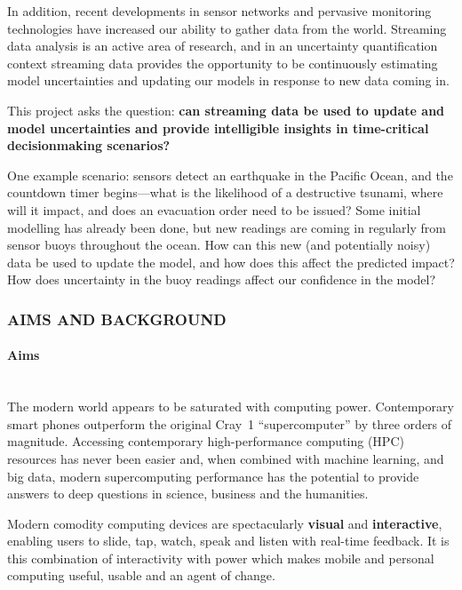 \documentclass[a4paper,fontsize=12pt]{scrartcl}
\begin{document}
In addition, recent developments in sensor networks and pervasive
monitoring technologies have increased our ability to gather data from
the world. Streaming data analysis is an active area of research, and
in an uncertainty quantification context streaming data provides the
opportunity to be continuously estimating model uncertainties and
updating our models in response to new data coming in.

This project asks the question: \textbf{can streaming data be used to
  update and model uncertainties and provide intelligible insights in
  time-critical decisionmaking scenarios?}

One example scenario: sensors detect an earthquake in the Pacific Ocean,
and the countdown timer begins---what is the likelihood of a
destructive tsunami, where will it impact, and does an evacuation
order need to be issued? Some initial modelling has already been done,
but new readings are coming in regularly from sensor buoys throughout
the ocean. How can this new (and potentially noisy) data be used to
update the model, and how does this affect the predicted impact? How
does uncertainty in the buoy readings affect our confidence in the
model?


\subsubsection*{AIMS AND BACKGROUND}
\label{SWfMS-grant}
\paragraph*{Aims}\mbox{}\\

The modern world appears to be saturated with computing power.
Contemporary smart phones outperform the original Cray~1
``supercomputer'' by three orders of magnitude. Accessing contemporary
high-performance computing (HPC) resources has never been easier and,
when combined with machine learning\cite{Hastie2009}, and big
data\cite{Manyika2011}, modern supercomputing performance has the
potential to provide answers to deep questions in science, business
and the humanities.

Modern comodity computing devices are spectacularly \textbf{visual}
and \textbf{interactive}, enabling users to slide, tap, watch, speak
and listen with real-time feedback. It is this combination of
interactivity with power which makes mobile and personal computing
useful, usable and an agent of change.
\end{document}
